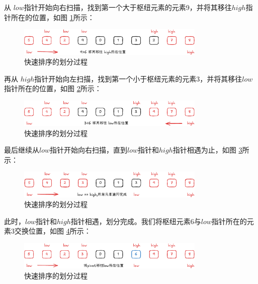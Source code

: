 \documentclass[lang=cn,newtx,10pt,scheme=chinese]{../elegantbook}
\begin{document}
从 $low$指针开始向右扫描，找到第一个大于枢纽元素的元素9，并将其移往$high$指针所在的位置，如图 \ref{fig:patition_f}所示：

\begin{figure}
[!htbp]
    \centering
    \includegraphics[width=0.8\textwidth]{./figure/pdf/cropped/patition_f.pdf}
    \caption{快速排序的划分过程}
    \label{fig:patition_f}
\end{figure}

再从 $high$指针开始向左扫描，找到第一个小于枢纽元素的元素3，并将其移往$low$指针所在的位置，如图 \ref{fig:patition_g}所示：

\begin{figure}
[!htbp]
    \centering
    \includegraphics[width=0.8\textwidth]{./figure/pdf/cropped/patition_g.pdf}
    \caption{快速排序的划分过程}
    \label{fig:patition_g}
\end{figure}


最后继续从$low$指针开始向右扫描，直到$low$指针和$high$指针相遇为止，如图 \ref{fig:patition_h}所示：

\begin{figure}
[!htbp]
    \centering
    \includegraphics[width=0.8\textwidth]{./figure/pdf/cropped/patition_h.pdf}
    \caption{快速排序的划分过程}
    \label{fig:patition_h}
\end{figure}

此时，$low$指针和$high$指针相遇，划分完成。我们将枢纽元素6与$low$指针所在的元素3交换位置，如图 \ref{fig:patition_i}所示：

\begin{figure}
[!htbp]
    \centering
    \includegraphics[width=0.8\textwidth]{./figure/pdf/cropped/patition_i.pdf}
    \caption{快速排序的划分过程}
    \label{fig:patition_i}
\end{figure}
\end{document}
